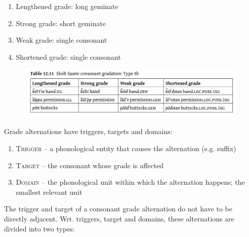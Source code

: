 \documentclass[a4paper, 12pt]{article}
\begin{document}
\begin{enumerate}[$\gg$]
	\begin{enumerate}[$\cdot$]
	\setlength\itemsep{0em}
		\item Lengthened grade: long geminate
		\item Strong grade: short geminate
		\item Weak grade: single consonant
		\item Shortened grade: single consonant
	\end{enumerate}
	
	\begin{figure}[H]
		\includegraphics[scale=.6]{skolt-grades2}
	\end{figure}
		
	\end{enumerate}
	Grade alternations have triggers, targets and domains:
	
	\begin{enumerate}[$\gg$]
	\setlength\itemsep{0em}
		\item \textsc{Trigger} -- a phonological entity that causes the alternation (e.g. suffix)
		\item \textsc{Target} -- the consonant whose grade is affected
		\item \textsc{Domain} -- the phonological unit within which the alternation happens; the smallest relevant unit
	\end{enumerate}
	The trigger and target of a consonant grade alternation do not have to be directly adjacent. Wrt. triggers, target and domains, these alternations are divided into two types:
	
\end{document}
